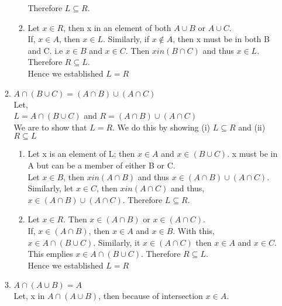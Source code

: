 \documentclass[a4paper,12pt]{article}
\begin{document}
\begin{enumerate}
\begin{enumerate}
\begin{enumerate}
                    Therefore $L \subseteq R$.
                \item
                    Let $x \in R$, then x in an element of both $A \cup B$ or $A \cup C$. \\
                    If, $x \in A$, then $x \in L$. Similarly, if $x \not\in A$, then x must be in both B and C. i.e $x \in B$ and $x \in C$. Then $x in (B \cap C)$ and thus $x \in L$. \\
                    Therefore $R \subseteq L$. \\
                    Hence we established $L = R$ \\
            \end{enumerate}
        \item
            $A \cap (B \cup C) = (A \cap B) \cup (A \cap C)$ \\
            Let,\\ $L = A \cap (B \cup C)$ and $R = (A \cap B) \cup (A \cap C)$ \\ 
            We are to show that $L = R$. We do this by showing (i) $L \subseteq R$ and (ii) $R \subseteq L$
            \begin{enumerate}
                \item
                    Let x is an element of L; then $x \in A$ and $x \in (B \cup C)$. x must be in A but can be a member of either B or C. \\
                    Let $x \in B$, then $x in (A \cap B)$ and thus $x \in (A \cap B) \cup (A \cap C)$. Similarly, let $x \in C$, then $x in (A \cap C)$ and thus, $x \in (A \cap B) \cup (A \cap C)$.
                    Therefore $L \subseteq R$.
                \item
                    Let $x \in R$. Then $x \in (A  \cap B)$ or $x \in (A \cap C)$. \\
                    If, $x \in (A \cap B)$, then $x \in A$ and $x \in B$. With this, $x \in A \cap (B \cup C)$. 
                    Similarly, it $x \in (A \cap C)$ then $x \in A$ and $x \in C$. This emplies $x \in A \cap (B \cup C)$.
                    Therefore $R \subseteq L$. \\
                    Hence we established $L = R$ \\
            \end{enumerate}
        \item
            $A \cap (A \cup B) = A$ \\
            Let, x in $A \cap (A \cup B)$, then because of intersection $x \in A$.\\

\end{enumerate}
\end{enumerate}
\end{document}
